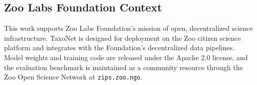 \subsection{Zoo Labs Foundation Context}

This work supports Zoo Labs Foundation's mission of open, decentralized
science infrastructure. TaxoNet is designed for deployment on the Zoo
citizen science platform and integrates with the Foundation's
decentralized data pipelines. Model weights and training code are
released under the Apache 2.0 license, and the evaluation benchmark
is maintained as a community resource through the Zoo Open Science
Network at \texttt{zips.zoo.ngo}.


